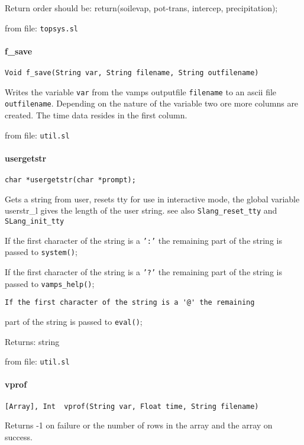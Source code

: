 Return order should be:
return(soilevap, pot-trans, intercep, precipitation);

from file: {\tt topsys.sl}


\paragraph{f\_save}
\begin{verbatim}
Void f_save(String var, String filename, String outfilename)
\end{verbatim}
Writes the variable {\tt var} from the vamps outputfile {\tt filename} to
an ascii file {\tt outfilename}. Depending on the nature of the variable
two ore more columns are created. The time data resides in the
first column.

from file: {\tt util.sl}


\paragraph{usergetstr}
\begin{verbatim}
char *usergetstr(char *prompt);
\end{verbatim}
Gets a string from user, resets tty for use in interactive 
mode, the global variable userstr\_l gives the length of the 
user string. see also {\tt Slang\_reset\_tty} and {\tt SLang\_init\_tty}


If the first character of the string is a {\tt ':'} the remaining
part of the string is passed to {\tt system()};


If the first character of the string is a {\tt '?'} the remaining
part of the string is passed to {\tt vamps\_help()};
\begin{verbatim}
If the first character of the string is a '@' the remaining
\end{verbatim}
part of the string is passed to {\tt eval()};


Returns: string

from file: {\tt util.sl}


\paragraph{vprof}
\begin{verbatim}
[Array], Int  vprof(String var, Float time, String filename)
\end{verbatim}
Returns -1 on failure or the number of rows
in the array and the array on success.


